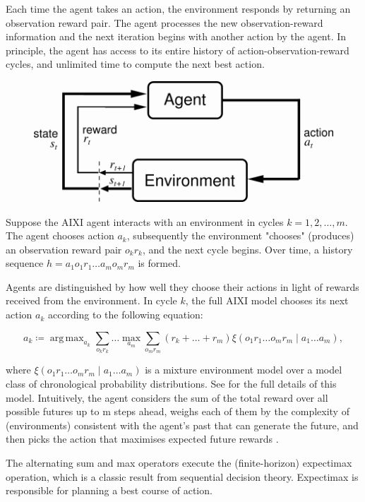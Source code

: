 \documentclass{article}
\theoremstyle{definition}
\newtheorem{primary statistics}[definition]{Primary Statistics}
\newtheorem{auxiliary statistics}[definition]{Auxiliary Statistics}
\DeclareMathOperator*{\argmax}{arg\,max} %
\begin{document}
Each time the agent takes an action, the environment responds by returning an observation reward pair. The agent processes the new observation-reward information and the next iteration begins with another action by the agent. In principle, the agent has access to its entire history of action-observation-reward cycles, and unlimited time to compute the next best action.  

\begin{figure}
\includegraphics[width = 12cm]{suttonbarto_rl}
	\caption{\citep{sutton1998reinforcement}}
\end{figure}
 

Suppose the AIXI agent interacts with an environment in cycles $k=1,2, \ldots, m$. The agent chooses action $a_k$, subsequently the environment "chooses" (produces) an observation reward pair $o_kr_k$, and the next cycle begins. Over time, a history sequence $h=a_1o_1r_1 \ldots a_mo_mr_m$ is formed.

Agents are distinguished by how well they choose their actions in light of rewards received from the environment. In cycle $k$, the full AIXI model chooses its next action $a_k$ according to the following equation:

$$a_k \coloneqq \argmax_{a_k} \sum_{o_kr_k} \ldots \max_{a_m} \sum_{o_mr_m} (r_k+\ldots+r_m) \xi (o_1r_1 \ldots o_mr_m \mid a_1 \ldots a_m), $$

where $\xi (o_1r_1 \ldots o_mr_m \mid a_1 \ldots a_m)$ is a mixture environment model over a model class of chronological probability distributions. See \citep{hutter2005universal} for the full details of this model. Intuitively, the agent considers the sum of the total reward over all possible futures up to m steps ahead, weighs each of them by the complexity of (environments) consistent with the agent’s past that can generate the future, and then picks the action that maximises expected future rewards \citep{veness2011monte}. 

The alternating sum and max operators execute the (finite-horizon) expectimax operation, which is a classic result from sequential decision theory. Expectimax is responsible for planning a best course of action.
\end{document}
